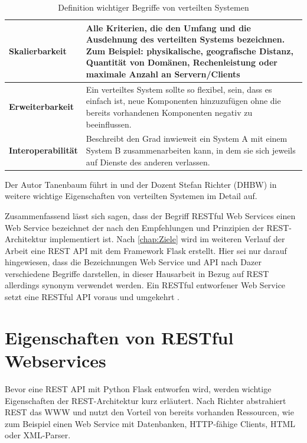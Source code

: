 \documentclass[a4paper,titlepage,halfparskip,12pt,listof=numbered]{scrreprt}
\begin{document}
\begin{onehalfspacing}
\begin{table}[h]
\centering
\caption{Definition wichtiger Begriffe von verteilten Systemen \cite[S.25ff.]{andrew2008verteilte}}
\begin{tabular}{|l|p{}|}
\hline
\textbf{Skalierbarkeit} & Alle Kriterien, die den Umfang und die Ausdehnung des verteilten Systems bezeichnen. Zum Beispiel: physikalische, geografische Distanz, Quantität von Domänen, Rechenleistung oder maximale Anzahl an Servern/Clients \\
\hline
\textbf{Erweiterbarkeit} & Ein verteiltes System sollte so flexibel, sein, dass es einfach ist, neue Komponenten hinzuzufügen ohne die bereits vorhandenen Komponenten negativ zu beeinflussen.\\
\hline
\textbf{Interoperabilität} & Beschreibt den Grad inwieweit ein System A mit einem System B zusammenarbeiten kann, in dem sie sich jeweils auf Dienste des anderen verlassen. \\
\hline
\end{tabular}
\label{tab:wichtigeBegriffe}
\end{table}

Der Autor Tanenbaum führt in \cite{andrew2008verteilte} und der Dozent Stefan Richter (\ac{DHBW}) in \cite{richterEinleitungVS} weitere wichtige Eigenschaften von verteilten Systemen im Detail auf.

Zusammenfassend lässt sich sagen, dass der Begriff \ac{REST}ful Web Services einen Web Service bezeichnet der nach den Empfehlungen und Prinzipien der \ac{REST}-Architektur implementiert ist. Nach \autoref{chap:Ziele} wird im weiteren Verlauf der Arbeit eine \ac{REST} \ac{API} mit dem Framework Flask erstellt. Hier sei nur darauf hingewiesen, dass die Bezeichnungen Web Service und API nach Dazer \cite[S.2]{dazerRESTUeberblick} verschiedene Begriffe darstellen, in dieser Hausarbeit in Bezug auf \ac{REST} allerdings synonym verwendet werden. Ein \ac{REST}ful entworfener Web Service setzt eine \ac{REST}ful API voraus und umgekehrt \cite[S.2]{dazerRESTUeberblick}.

\section{Eigenschaften von \ac{REST}ful Webservices}
\label{sec:EigenschaftenREST}

Bevor eine \ac{REST} \ac{API} mit Python Flask entworfen wird, werden wichtige Eigenschaften der \ac{REST}-Architektur kurz erläutert. Nach Richter \cite[S.28]{richterKommunikationVS} abstrahiert \ac{REST} das \ac{WWW} und nutzt den Vorteil von bereits vorhanden Ressourcen, wie zum Beispiel einen Web Service mit Datenbanken, \acs{HTTP}-fähige Clients, \acs{HTML} oder \acs{XML}-Parser.


\end{onehalfspacing}
\end{document}
